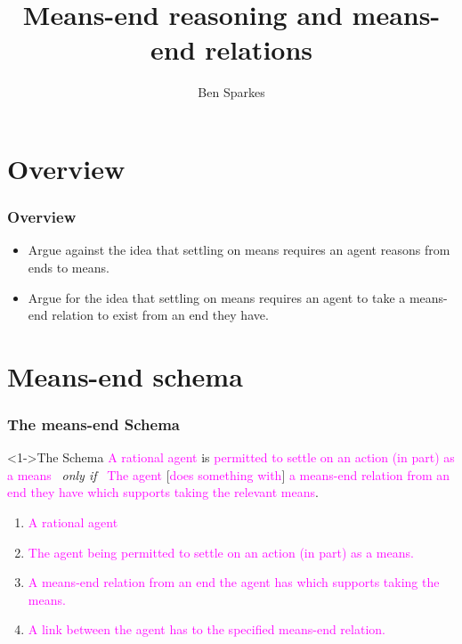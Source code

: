 \documentclass[noamssymb,
]{beamer} %
\title{Means-end reasoning and means-end relations}
\author{Ben Sparkes}
\begin{document}
\begin{frame}[noframenumbering]
  \titlepage
\end{frame}


\section*{Overview}
\label{sec:overview}

\begin{frame}
  \frametitle{Overview}

  \begin{itemize}
  \item Argue against the idea that settling on means requires an agent reasons from ends to means.
  \item Argue for the idea that settling on means requires an agent to take a means-end relation to exist from an end they have.
  \end{itemize}
\end{frame}


\section{Means-end schema}
\label{sec:schema}

\begin{frame}
  \frametitle{The means-end Schema}

  \begin{block}<1->{The Schema}
    \textcolor<3>{fuchsia}{A rational agent} is \textcolor<4>{fuchsia}{permitted to settle on an action (in part) as a means}
    \newline
    \mbox{ }\hfill\emph{only if}\hfill\mbox{ }
    \newline
    \textcolor<3>{fuchsia}{The agent} [\textcolor<6>{fuchsia}{does something with}] \textcolor<5>{fuchsia}{a means-end relation from an end they have which supports taking the relevant means}.
  \end{block}

  \begin{enumerate}%
  \item<3-6> \textcolor<3>{fuchsia}{A rational agent}
  \item<4-6> \textcolor<4>{fuchsia}{The agent being permitted to settle on an action (in part) as a means.}
  \item<5-6> \textcolor<5>{fuchsia}{A means-end relation from an end the agent has which supports taking the means.}
  \item<6-6> \textcolor<6>{fuchsia}{A link between the agent has to the specified means-end relation.}
  \end{enumerate}
\end{frame}
\end{document}
